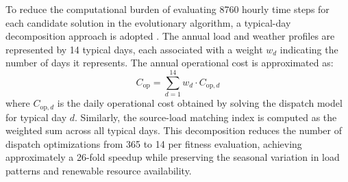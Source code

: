 To reduce the computational burden of evaluating 8760 hourly time steps for each candidate solution in the evolutionary algorithm, a typical-day decomposition approach is adopted \cite{kotzur2018impact,dominguez2012selection}. The annual load and weather profiles are represented by 14 typical days, each associated with a weight $w_d$ indicating the number of days it represents. The annual operational cost is approximated as:
\begin{equation}
    C_{\text{op}} = \sum_{d=1}^{14} w_d \cdot C_{\text{op},d}
    \label{eq:typical_day}
\end{equation}
where $C_{\text{op},d}$ is the daily operational cost obtained by solving the dispatch model for typical day $d$. Similarly, the source-load matching index is computed as the weighted sum across all typical days. This decomposition reduces the number of dispatch optimizations from 365 to 14 per fitness evaluation, achieving approximately a 26-fold speedup while preserving the seasonal variation in load patterns and renewable resource availability.

